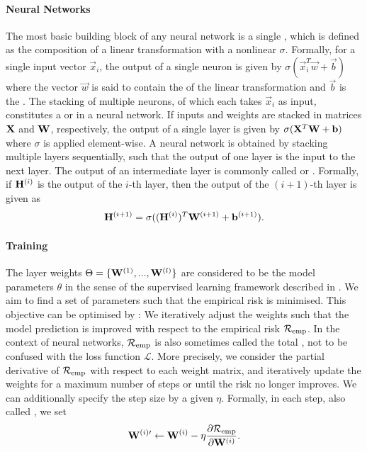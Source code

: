 \documentclass[
	fontsize=10pt, %
	twoside=false, %
	secnumdepth=1, %
  toc=indentunnumbered %
]{kaobook}
\begin{document}
\paragraph{Neural Networks}
The most basic building block of any neural network is a single ,
which is defined as the composition of a linear transformation with a nonlinear
 $\sigma$. Formally, for a single input vector $\vec
x_i$, the output of a single neuron is given by $\sigma(\vec x_i^T \vec w + \vec
b)$ where the vector $\vec w$ is said to contain the  of the linear
transformation and $\vec b$ is the . The stacking of multiple neurons,
of which each takes $\vec x_i$ as input, constitutes a  or
  in a neural network. If inputs and weights are stacked
in matrices $\mathbf{X}$ and $\mathbf{W}$, respectively, the output of a single layer is
given by $\sigma(\mathbf{X}^T \mathbf{W} + \mathbf{b})$ where $\sigma$ is applied
element-wise.
%
A neural network is obtained by stacking multiple layers sequentially, such that
the output of one layer is the input to the next layer. The output of an
intermediate layer is commonly called  or 
. Formally, if $\mathbf{H}^{(i)}$ is the output of the $i$-th layer,
then the output of the $(i+1)$-th layer is given as
\begin{align}
\mathbf{H}^{(i+1)} = \sigma((\mathbf{H}^{(i)})^T \mathbf{W}^{(i+1)} + \mathbf{b}^{(i+1)}).
\label{eq:fully-connected}
\end{align}
%

\paragraph{Training} The layer weights $\Theta = \{\mathbf{W}^{(1)}, ...,
\mathbf{W}^{(l)}\}$ are considered to be the model parameters $\theta$ in the sense
of the supervised learning framework described in .
We aim to find a set of parameters such that the empirical risk is minimised.
This objective can be
optimised by : We iteratively adjust the weights
such that the model prediction is improved with respect to the empirical risk
$\mathcal{R}_{\text{emp}}$. In the context of neural networks, $\mathcal{R}_{\text{emp}}$ is also sometimes called the
total , not to be confused with the loss function $\mathcal{L}$. More
precisely, we consider the partial derivative of $\mathcal{R}_{\text{emp}}$ with respect to each
weight matrix, and iteratively update the weights for a maximum number of steps
or until the risk no longer improves. We can additionally specify the step size
by a given  $\eta$. Formally, in each step, also called
, we set
\begin{align*}
\mathbf{W}^{(i)\prime} \gets
\mathbf{W}^{(i)} - \eta \frac{\partial \mathcal{R}_{\text{emp}}}{\partial \mathbf{W}^{(i)}}.
\end{align*}
\end{document}
